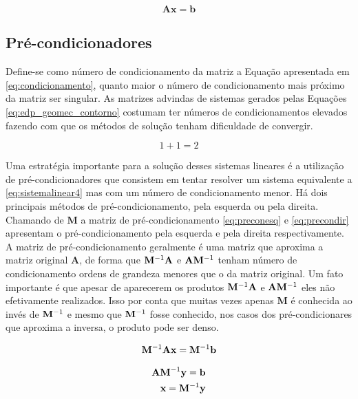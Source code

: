 \begin{equation} \label{eq:sistemalinear4}
    \mathbf{Ax = b}
\end{equation}

\subsection{Pré-condicionadores}

Define-se como número de condicionamento da matriz a Equação apresentada em \eqref{eq:condicionamento}, quanto maior o número de condicionamento mais próximo da matriz ser singular. As matrizes advindas de sistemas gerados pelas Equações \eqref{eq:edp_geomec_contorno} costumam ter números de condicionamentos elevados fazendo com que os métodos de solução tenham dificuldade de convergir.

\begin{equation} \label{eq:condicionamento}
1+1=2
\end{equation}


Uma estratégia importante para a solução desses sistemas lineares é a utilização de pré-condicionadores que consistem em tentar resolver um sistema equivalente a \eqref{eq:sistemalinear4} mas com um número de condicionamento menor. Há dois principais métodos de pré-condicionamento, pela esquerda ou pela direita. Chamando de $\mathbf{M}$ a matriz de pré-condicionamento  \eqref{eq:preconesq} e \eqref{eq:precondir} apresentam o pré-condicionamento pela esquerda e pela direita respectivamente. A matriz de pré-condicionamento geralmente é uma matriz que aproxima a matriz original $\mathbf{A}$, de forma que $\mathbf{M}^{-1} \mathbf{A}$ e $\mathbf{A} \mathbf{M}^{-1}$ tenham número de condicionamento ordens de grandeza menores que o da matriz original. Um fato importante é que apesar de aparecerem os produtos $\mathbf{M}^{-1} \mathbf{A}$ e $\mathbf{A} \mathbf{M}^{-1}$ eles não efetivamente realizados. Isso por conta que muitas vezes apenas $\mathbf{M}$ é conhecida ao invés de $\mathbf{M}^{-1}$ e mesmo que $\mathbf{M}^{-1}$ fosse conhecido, nos casos dos pré-condicionares que aproxima a inversa, o produto pode ser denso. 


\begin{equation} \label{eq:preconesq}
\mathbf{M}^{-1} \mathbf{A} \mathbf{x}= \mathbf{M}^{-1} \mathbf{b}
\end{equation}

\begin{align} \label{eq:precondir}
\mathbf{A} \mathbf{M}^{-1} \mathbf{y} = \mathbf{b} \\
\mathbf{x} = \mathbf{M}^{-1} \mathbf{{y}}
\end{align}


